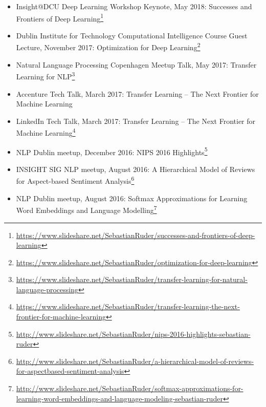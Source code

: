 \documentclass[10pt,letterpaper]{article}
\begin{document}
\begin{itemize}
	\parskip=0.1em
	
	\item Insight@DCU Deep Learning Workshop Keynote, May 2018: Successes and Frontiers of Deep Learning\footnote{\url{https://www.slideshare.net/SebastianRuder/successes-and-frontiers-of-deep-learning}}
	
	\item Dublin Institute for Technology Computational Intelligence Course Guest Lecture, November 2017: Optimization for Deep Learning\footnote{\url{https://www.slideshare.net/SebastianRuder/optimization-for-deep-learning}}
		
	\item Natural Language Processing Copenhagen Meetup Talk, May 2017: Transfer Learning for NLP\footnote{\url{https://www.slideshare.net/SebastianRuder/transfer-learning-for-natural-language-processing}}
	
	\item Accenture Tech Talk, March 2017: Transfer Learning -- The Next Frontier for Machine Learning
	
	\item LinkedIn Tech Talk, March 2017: Transfer Learning -- The Next Frontier for Machine Learning\footnote{\url{https://www.slideshare.net/SebastianRuder/transfer-learning-the-next-frontier-for-machine-learning}}
	
	\item NLP Dublin meetup, December 2016: NIPS 2016 Highlights\footnote{\url{http://www.slideshare.net/SebastianRuder/nips-2016-highlights-sebastian-ruder}}
	
	\item INSIGHT SIG NLP meetup, August 2016: A Hierarchical Model of Reviews for Aspect-based Sentiment Analysis\footnote{\url{http://www.slideshare.net/SebastianRuder/a-hierarchical-model-of-reviews-for-aspectbased-sentiment-analysis}}
	
	\item NLP Dublin meetup, August 2016: Softmax Approximations for Learning Word Embeddings and Language Modelling\footnote{\url{http://www.slideshare.net/SebastianRuder/softmax-approximations-for-learning-word-embeddings-and-language-modeling-sebastian-ruder}}
	
\end{itemize}
\end{document}
